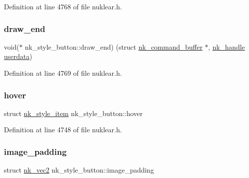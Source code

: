 Definition at line 4768 of file nuklear.\+h.

\mbox{\label{structnk__style__button_a10cbc466ee1819b82fa19867095141a1}} 
\subsubsection{\texorpdfstring{draw\+\_\+end}{draw\_end}}
{\footnotesize\ttfamily void($\ast$ nk\+\_\+style\+\_\+button\+::draw\+\_\+end) (struct \mbox{\hyperlink{structnk__command__buffer}{nk\+\_\+command\+\_\+buffer}} $\ast$, \mbox{\hyperlink{unionnk__handle}{nk\+\_\+handle}} \mbox{\hyperlink{structnk__style__button_a486c8383bd02dae018cacaa370bf0c43}{userdata}})}



Definition at line 4769 of file nuklear.\+h.

\mbox{\label{structnk__style__button_a79019a05062f31a26cee5270f31a1c92}} 
\subsubsection{\texorpdfstring{hover}{hover}}
{\footnotesize\ttfamily struct \mbox{\hyperlink{structnk__style__item}{nk\+\_\+style\+\_\+item}} nk\+\_\+style\+\_\+button\+::hover}



Definition at line 4748 of file nuklear.\+h.

\mbox{\label{structnk__style__button_ab53cdca97ddb24dea561e1cec88b3ba2}} 
\subsubsection{\texorpdfstring{image\+\_\+padding}{image\_padding}}
{\footnotesize\ttfamily struct \mbox{\hyperlink{structnk__vec2}{nk\+\_\+vec2}} nk\+\_\+style\+\_\+button\+::image\+\_\+padding}



